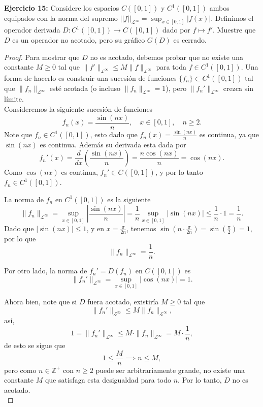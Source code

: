 \textbf{Ejercicio 15:} Considere los espacios $C([0,1])$ y $C^1([0,1])$ ambos equipados con la norma del supremo $||f||_{\mathcal{L}^{\infty}} = \sup_{x \in [0,1]} |f(x)|$. Definimos el operador derivada $D: C^1([0,1]) \to C([0,1])$ dado por $f \mapsto f'$. Muestre que $D$ es un operador no acotado, pero su gráfico $G(D)$ es cerrado.
\begin{proof}
Para mostrar que $D$ no es acotado, debemos probar que no existe una constante $M \geq 0$ tal que $\|f'\|_{\mathcal{L}^\infty} \leq M \|f\|_{\mathcal{L}^\infty}$ para toda $f \in C^1([0,1])$. Una forma de hacerlo es construir una sucesión de funciones $\{f_n\} \subset C^1([0,1])$ tal que $\|f_n\|_{\mathcal{L}^\infty}$ esté acotada (o incluso $\|f_n\|_{\mathcal{L}^\infty} = 1$), pero $\|f_n'\|_{\mathcal{L}^\infty}$ crezca sin límite.\\

Consideremos la siguiente sucesión de funciones
$$f_n(x) = \frac{\sin(nx)}{n}, \quad x \in [0,1], \quad n \geq 2.$$
Note que $f_n \in C^1([0,1])$, esto dado que $f_n(x) = \frac{\sin(nx)}{n}$ es continua, ya que $\sin(nx)$ es continua. Además su derivada esta dada por
$$f_n'(x) = \frac{d}{dx} \left( \frac{\sin(nx)}{n} \right) = \frac{n \cos(nx)}{n} = \cos(nx).$$
Como $\cos(nx)$ es continua, $f_n' \in C([0,1])$, y por lo tanto $f_n \in C^1([0,1])$.

La norma de $f_n$ en $C^1([0,1])$ es la siguiente
  $$\|f_n\|_{\mathcal{L}^\infty} = \sup_{x \in [0,1]} \left| \frac{\sin(nx)}{n} \right| = \frac{1}{n} \sup_{x \in [0,1]} |\sin(nx)| \leq \frac{1}{n} \cdot 1 = \frac{1}{n}.$$
Dado que $|\sin(nx)| \leq 1$, y en $x = \frac{\pi}{2n}$, tenemos $\sin\left(n \cdot \frac{\pi}{2n}\right) = \sin\left(\frac{\pi}{2}\right) = 1$, por lo que
  $$
  \|f_n\|_{\mathcal{L}^\infty} = \frac{1}{n}.
  $$

Por otro lado, la norma de $f_n' = D(f_n)$ en $C([0,1])$ es
  $$\|f_n'\|_{\mathcal{L}^\infty} = \sup_{x \in [0,1]} |\cos(nx)| = 1.$$

Ahora bien, note que si $D$ fuera acotado, existiría $M \geq 0$ tal que
$$\|f_n'\|_{\mathcal{L}^\infty} \leq M \|f_n\|_{\mathcal{L}^\infty},$$
así,
$$1 = \|f_n'\|_{\mathcal{L}^\infty} \leq M \cdot \|f_n\|_{\mathcal{L}^\infty} = M \cdot \frac{1}{n},$$
de esto se sigue que
$$1 \leq \frac{M}{n} \implies n \leq M,$$
pero como $n\in \mathbb{Z}^+$ con $n\geq 2$ puede ser arbitrariamente grande, no existe una constante $M$ que satisfaga esta desigualdad para todo $n$. Por lo tanto, $D$ no es acotado.\\


\end{proof}
